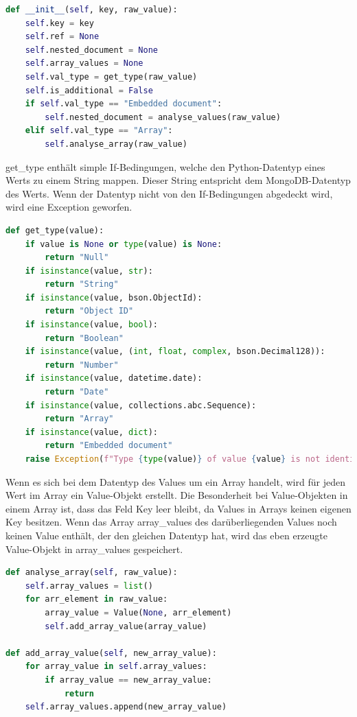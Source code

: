 \begin{lstlisting}[language=python, caption={Value.\_\_init\_\_},label={lst:backend_value_init}]
def __init__(self, key, raw_value):
    self.key = key
    self.ref = None
    self.nested_document = None
    self.array_values = None
    self.val_type = get_type(raw_value)
    self.is_additional = False
    if self.val_type == "Embedded document":
        self.nested_document = analyse_values(raw_value)
    elif self.val_type == "Array":
        self.analyse_array(raw_value)
\end{lstlisting}

get\_type enthält simple If-Bedingungen, welche den Python-Datentyp eines Werts zu einem String mappen.
Dieser String entspricht dem MongoDB-Datentyp des Werts.
Wenn der Datentyp nicht von den If-Bedingungen abgedeckt wird, wird eine Exception geworfen.

\begin{lstlisting}[language=python, caption={Value.get\_type},label={lst:backend_value_get_type}]
def get_type(value):
    if value is None or type(value) is None:
        return "Null"
    if isinstance(value, str):
        return "String"
    if isinstance(value, bson.ObjectId):
        return "Object ID"
    if isinstance(value, bool):
        return "Boolean"
    if isinstance(value, (int, float, complex, bson.Decimal128)):
        return "Number"
    if isinstance(value, datetime.date):
        return "Date"
    if isinstance(value, collections.abc.Sequence):
        return "Array"
    if isinstance(value, dict):
        return "Embedded document"
    raise Exception(f"Type {type(value)} of value {value} is not identifiable!")
\end{lstlisting}

Wenn es sich bei dem Datentyp des Values um ein Array handelt, wird für jeden Wert im Array ein Value-Objekt erstellt.
Die Besonderheit bei Value-Objekten in einem Array ist, dass das Feld Key leer bleibt, da Values in Arrays keinen eigenen Key besitzen.
Wenn das Array array\_values des darüberliegenden Values noch keinen Value enthält, der den gleichen Datentyp hat, wird das eben erzeugte Value-Objekt in array\_values gespeichert.

\begin{lstlisting}[language=python, caption={Value.analyse\_array},label={lst:backend_value_analyse_array}]
def analyse_array(self, raw_value):
    self.array_values = list()
    for arr_element in raw_value:
        array_value = Value(None, arr_element)
        self.add_array_value(array_value)

def add_array_value(self, new_array_value):
    for array_value in self.array_values:
        if array_value == new_array_value:
            return
    self.array_values.append(new_array_value)
\end{lstlisting}

